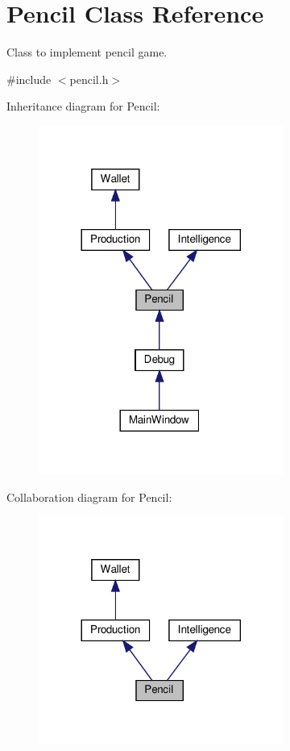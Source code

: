\hypertarget{classPencil}{}\section{Pencil Class Reference}
\label{classPencil}


Class to implement pencil game.  




{\ttfamily \#include $<$pencil.\+h$>$}



Inheritance diagram for Pencil\+:
\nopagebreak
\begin{figure}[H]
\begin{center}
\leavevmode
\includegraphics[width=228pt]{classPencil__inherit__graph}
\end{center}
\end{figure}


Collaboration diagram for Pencil\+:
\nopagebreak
\begin{figure}[H]
\begin{center}
\leavevmode
\includegraphics[width=228pt]{classPencil__coll__graph}
\end{center}
\end{figure}
